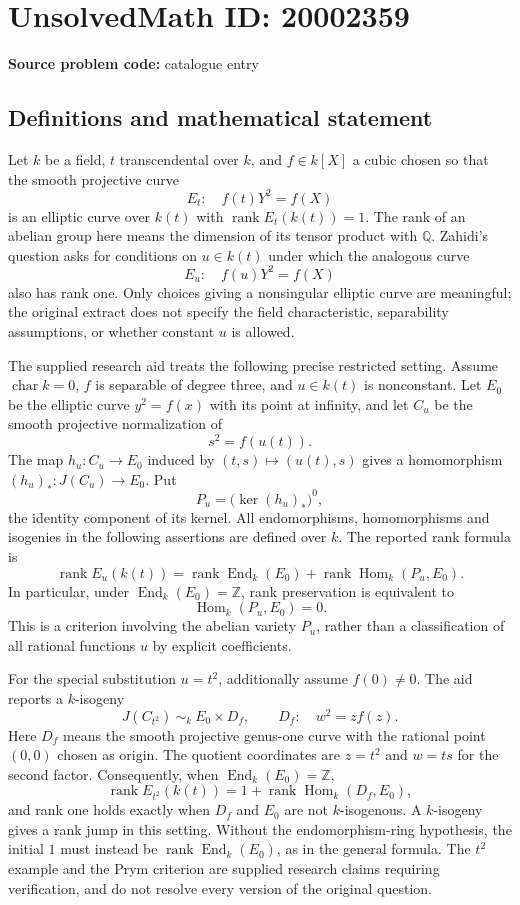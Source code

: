 \documentclass[11pt]{article}
\newcommand{\Z}{\mathbb{Z}}
\newcommand{\Q}{\mathbb{Q}}
\begin{document}
\section*{UnsolvedMath ID: 20002359}
\textbf{Source problem code:} catalogue entry
\subsection{Definitions and mathematical statement}
Let $k$ be a field, $t$ transcendental over $k$, and $f\in k[X]$ a cubic chosen so that the smooth projective curve
\[
 E_t:\quad f(t)Y^2=f(X)
\]
is an elliptic curve over $k(t)$ with $\operatorname{rank}E_t(k(t))=1$. The rank of an abelian group here means the dimension of its tensor product with $\Q$. Zahidi's question asks for conditions on $u\in k(t)$ under which the analogous curve
\[
 E_u:\quad f(u)Y^2=f(X)
\]
also has rank one. Only choices giving a nonsingular elliptic curve are meaningful; the original extract does not specify the field characteristic, separability assumptions, or whether constant $u$ is allowed.

The supplied research aid treats the following precise restricted setting. Assume $\operatorname{char}k=0$, $f$ is separable of degree three, and $u\in k(t)$ is nonconstant. Let $E_0$ be the elliptic curve $y^2=f(x)$ with its point at infinity, and let $C_u$ be the smooth projective normalization of
\[
 s^2=f(u(t)).
\]
The map $h_u:C_u\to E_0$ induced by $(t,s)\mapsto(u(t),s)$ gives a homomorphism $(h_u)_*:J(C_u)\to E_0$. Put
\[
 P_u=\bigl(\ker (h_u)_*\bigr)^0,
\]
the identity component of its kernel. All endomorphisms, homomorphisms and isogenies in the following assertions are defined over $k$. The reported rank formula is
\[
 \operatorname{rank}E_u(k(t))
 =\operatorname{rank}\operatorname{End}_k(E_0)
  +\operatorname{rank}\operatorname{Hom}_k(P_u,E_0).
\]
In particular, under $\operatorname{End}_k(E_0)=\Z$, rank preservation is equivalent to
\[
 \operatorname{Hom}_k(P_u,E_0)=0.
\]
This is a criterion involving the abelian variety $P_u$, rather than a classification of all rational functions $u$ by explicit coefficients.

For the special substitution $u=t^2$, additionally assume $f(0)\ne0$. The aid reports a $k$-isogeny
\[
 J(C_{t^2})\ \sim_k\ E_0\times D_f,
 \qquad D_f:\quad w^2=z f(z).
\]
Here $D_f$ means the smooth projective genus-one curve with the rational point $(0,0)$ chosen as origin. The quotient coordinates are $z=t^2$ and $w=ts$ for the second factor. Consequently, when $\operatorname{End}_k(E_0)=\Z$,
\[
 \operatorname{rank}E_{t^2}(k(t))
 =1+\operatorname{rank}\operatorname{Hom}_k(D_f,E_0),
\]
and rank one holds exactly when $D_f$ and $E_0$ are not $k$-isogenous. A $k$-isogeny gives a rank jump in this setting. Without the endomorphism-ring hypothesis, the initial $1$ must instead be $\operatorname{rank}\operatorname{End}_k(E_0)$, as in the general formula. The $t^2$ example and the Prym criterion are supplied research claims requiring verification, and do not resolve every version of the original question.
\end{document}
